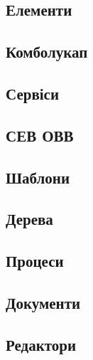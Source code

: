 \subsection{Елементи}

\subsection{Комболукап}

\subsection{Сервіси}

\subsection{СЕВ ОВВ}

\subsection{Шаблони}

\subsection{Дерева}

\subsection{Процеси}

\subsection{Документи}

\subsection{Редактори}




